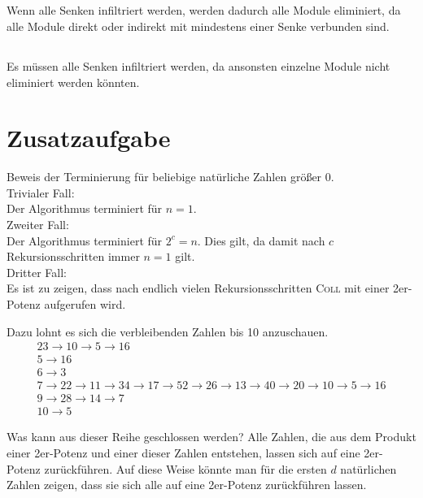 \documentclass[10pt,a4paper,oneside,ngerman,numbers=noenddot]{scrartcl}
\begin{document}
	\subsection{} %
		Wenn alle Senken infiltriert werden, werden dadurch alle Module eliminiert, da alle Module direkt oder indirekt mit mindestens einer Senke verbunden sind.
	\subsection{} %
		Es müssen alle Senken infiltriert werden, da ansonsten einzelne Module nicht eliminiert werden könnten.
	
\section*{Zusatzaufgabe} %
		
	Beweis der Terminierung für beliebige natürliche Zahlen größer $0$.\\
	Trivialer Fall: \\
	Der Algorithmus terminiert für $n=1$. \\
	Zweiter Fall: \\
	Der Algorithmus terminiert für $2^{c} = n$. Dies gilt, da damit nach $c$ Rekursionsschritten immer $n=1$ gilt. \\
	Dritter Fall: \\
	Es ist zu zeigen, dass nach endlich vielen Rekursionsschritten \textsc{Coll} mit einer 2er-Potenz aufgerufen wird.
	
	Dazu lohnt es sich die verbleibenden Zahlen bis 10 anzuschauen.
	\begin{alignat*}{2}
		3 \rightarrow 10 \rightarrow 5 \rightarrow 16 \\
		5 \rightarrow 16 \\
		6 \rightarrow 3 \\
		7 \rightarrow 22 \rightarrow 11 \rightarrow 34 \rightarrow 17 \rightarrow 52 \rightarrow 26 \rightarrow 13 \rightarrow 40 \rightarrow 20 \rightarrow 10 \rightarrow 5 \rightarrow 16 \\
		9 \rightarrow 28 \rightarrow 14 \rightarrow 7 \\
		10 \rightarrow 5
	\end{alignat*}
	
	Was kann aus dieser Reihe geschlossen werden? Alle Zahlen, die aus dem Produkt einer 2er-Potenz und einer dieser Zahlen entstehen, lassen sich auf eine 2er-Potenz zurückführen. Auf diese Weise könnte man für die ersten $d$ natürlichen Zahlen zeigen, dass sie sich alle auf eine 2er-Potenz zurückführen lassen.
	
\end{document}
